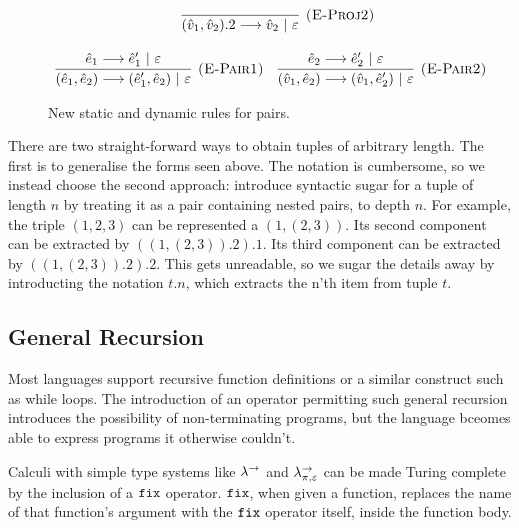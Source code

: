 \begin{figure}[h]
\[\begin{array}{c}
	~~~
	
\infer[\textsc{(E-Proj2)}]
	{(\hat v_1, \hat v_2).2 \longrightarrow \hat v_2~|~\varepsilon}
	{} \\[3ex]

\infer[\textsc{(E-Pair1)}]
	{(\hat e_1, \hat e_2) \longrightarrow (\hat e_1', \hat e_2)~|~\varepsilon}
	{\hat e_1 \longrightarrow \hat e_1'~|~\varepsilon}
	
	~~~
	
\infer[\textsc{(E-Pair2)}]
	{(\hat v_1, \hat e_2) \longrightarrow (\hat v_1, \hat e_2')~|~\varepsilon}
	{\hat e_2 \longrightarrow \hat e_2'~|~\varepsilon}

\end{array}
\]

\vspace{-12pt}
\caption{New static and dynamic rules for pairs.}
\label{A sample. }
\end{figure}

There are two straight-forward ways to obtain tuples of arbitrary length. The first is to generalise the forms seen above. The notation is cumbersome, so we instead choose the second approach: introduce syntactic sugar for a tuple of length $n$ by treating it as a pair containing nested pairs, to depth $n$. For example, the triple $(1,2,3)$ can be represented a $(1, (2,3))$. Its second component can be extracted by $((1, (2,3)).2).1$. Its third component can be extracted by $((1, (2,3)).2).2$. This gets unreadable, so we sugar the details away by introducting the notation $t.n$, which extracts the n'th item from tuple $t$.

\subsection{General Recursion}

Most languages support recursive function definitions or a similar construct such as while loops. The introduction of an operator permitting such general recursion introduces the possibility of non-terminating programs, but the language bceomes able to express programs it otherwise couldn't.

Calculi with simple type systems like $\lambda^{\rightarrow}$ and $\lambda^{\rightarrow}_{\pi, \varepsilon}$ can be made Turing complete by the inclusion of a $\mathtt{fix}$ operator. $\mathtt{fix}$, when given a function, replaces the name of that function's argument with the $\mathtt{fix}$ operator itself, inside the function body.

